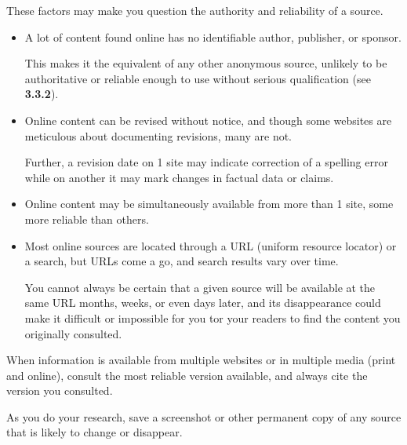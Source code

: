 \documentclass[oneside]{book}
\numberwithin{equation}{section}
\begin{document}
These factors may make you question the authority and reliability of a source.
\begin{itemize}
    \item A lot of content found online has no identifiable author, publisher, or sponsor.
    
    This makes it the equivalent of any other anonymous source, unlikely to be authoritative or reliable enough to use without serious qualification (see \textbf{3.3.2}).
    \item Online content can be revised without notice, and though some websites are meticulous about documenting revisions, many are not.
    
    Further, a revision date on 1 site may indicate correction of a spelling error while on another it may mark changes in factual data or claims.
    \item Online content may be simultaneously available from more than 1 site, some more reliable than others.
    \item Most online sources are located through a URL (uniform resource locator) or a search, but URLs come a go, and search results vary over time.
    
    You cannot always be certain that a given source will be available at the same URL months, weeks, or even days later, and its disappearance could make it difficult or impossible for you tor your readers to find the content you originally consulted.
\end{itemize}

When information is available from multiple websites or in multiple media (print and online), consult the most reliable version available, and always cite the version you consulted.

As you do your research, save a screenshot or other permanent copy of any source that is likely to change or disappear.
\end{document}
